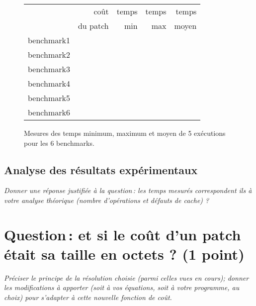 \documentclass[a4paper, 10pt, french]{article}
\begin{document}
    \begin{figure}[h]
      \begin{center}
        \begin{tabular}{|l||r||r|r|r||}
          \hline
          \hline
            & coût         & temps     & temps   & temps \\
            & du patch     & min       & max     & moyen \\
          \hline
          \hline
            benchmark1 &      &     &     &     \\
          \hline
            benchmark2 &      &     &     &     \\
          \hline
            benchmark3 &      &     &     &     \\
          \hline
            benchmark4 &      &     &     &     \\
          \hline
            benchmark5 &      &     &     &     \\
          \hline
            benchmark6 &      &     &     &     \\
          \hline
          \hline
        \end{tabular}
        \caption{Mesures des temps minimum, maximum et moyen de 5 exécutions pour les 6 benchmarks.}
        \label{table-temps}
      \end{center}
    \end{figure}

\subsection{Analyse des résultats expérimentaux}
{\em Donner  une réponse justifiée  à la question\,: 
              les  temps mesurés correspondent ils  à votre analyse théorique (nombre d’opérations et défauts de cache) ?
}

\section{Question\,: et  si le coût d'un patch était sa taille en octets ? (1 point)}
{\em Préciser le principe de la résolution choisie (parmi celles vues en cours); donner  les modifications à apporter (soit à vos  équations, soit à votre programme, au choix) 
pour s'adapter à cette nouvelle fonction de coût. 
}
\end{document}
